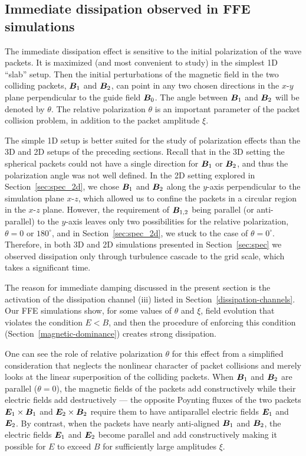 \subsection{Immediate dissipation observed in FFE simulations}
\label{sec:ffe_diss}
The immediate dissipation effect is sensitive to the initial polarization of the wave packets. It is maximized (and most convenient to study) in the simplest 1D ``slab'' setup. Then the initial perturbations of the magnetic field in the two colliding packets, $\boldsymbol{B}_1$ and $\boldsymbol{B}_2$, can point in any two chosen directions in the $x$-$y$ plane perpendicular to the guide field $\boldsymbol{B}_0$. The angle between $\boldsymbol{B}_1$ and $\boldsymbol{B}_2$ will be denoted by $\theta$. The relative polarization $\theta$ is an important parameter of the packet collision problem, in addition to the packet amplitude $\xi$.

The simple 1D setup is better suited for the study of polarization effects than the 3D and 2D setups of the preceding sections. Recall that in the 3D setting the spherical packets could not have a single direction for $\boldsymbol{B}_1$ or $\boldsymbol{B}_2$, and thus the polarization angle was not well defined. In the 2D setting explored in Section~\ref{sec:spec_2d}, we chose $\boldsymbol{B}_1$ and $\boldsymbol{B}_2$ along the $y$-axis perpendicular to the simulation plane $x$-$z$, which allowed us to confine the packets in a circular region in the $x$-$z$ plane. However, the requirement of $\boldsymbol{B}_{1,2}$ being parallel (or anti-parallel) to the $y$-axis leaves only two possibilities for the relative polarization, $\theta=0$ or $180^\circ$, and in Section~\ref{sec:spec_2d}, we stuck to the case of $\theta = 0^\circ$.
Therefore, in both 3D and 2D simulations presented in Section~\ref{sec:spec} we observed dissipation only through turbulence cascade to the grid scale, which takes a significant time.

The reason for immediate damping discussed in the present section is the activation of the dissipation channel (iii) listed in Section~\ref{dissipation-channels}. Our FFE simulations show, for some values of $\theta$ and $\xi$, field evolution that violates the condition $E<B$, and then the procedure of enforcing this condition (Section~\ref{magnetic-dominance}) creates strong dissipation.

One can see the role of relative polarization $\theta$ for this effect from a simplified consideration that neglects the nonlinear character of  packet collisions and merely looks at the linear superposition of the colliding packets. When $\boldsymbol{B}_1$ and $\boldsymbol{B}_2$ are parallel ($\theta=0$), the magnetic fields of the packets add constructively while their electric fields add destructively --- the opposite Poynting fluxes of the two packets $\boldsymbol{E}_1\times \boldsymbol{B}_1$ and $\boldsymbol{E}_2\times\boldsymbol{B}_2$ require them to have antiparallel electric fields $\boldsymbol{E}_1$ and $\boldsymbol{E}_2$. 
By contrast, when the packets have nearly anti-aligned $\boldsymbol{B}_1$ and $\boldsymbol{B}_2$, the electric fields $\boldsymbol{E}_1$ and $\boldsymbol{E}_2$ become parallel and add constructively making it possible for $E$ to exceed $B$ for sufficiently large amplitudes $\xi$.

